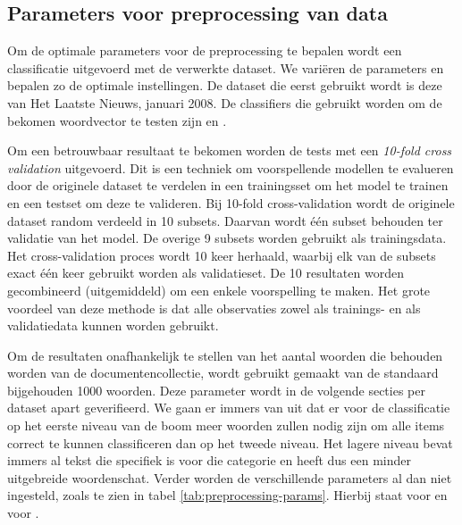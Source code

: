 \subsection{Parameters voor preprocessing van data}\label{parameters-voor-preprocessing}

Om de optimale parameters voor de preprocessing te bepalen wordt een classificatie uitgevoerd met de verwerkte dataset. We vari\"eren de parameters en bepalen zo de optimale instellingen. De dataset die eerst gebruikt wordt is deze van Het Laatste Nieuws, januari 2008. De classifiers die gebruikt worden om de bekomen woordvector te testen zijn  en . 

Om een betrouwbaar resultaat te bekomen worden de tests met een \textit{10-fold cross validation}\label{10-fold-cv} \cite{Bengio2004} uitgevoerd. Dit is een techniek om voorspellende modellen te evalueren door de originele dataset te verdelen in een trainingsset om het model te trainen en een testset om deze te valideren. Bij 10-fold cross-validation\label{cross-val} wordt de originele dataset random verdeeld in 10 subsets. Daarvan wordt \'e\'en subset behouden ter validatie van het model. De overige 9 subsets worden gebruikt als trainingsdata. Het cross-validation proces wordt 10 keer herhaald, waarbij elk van de subsets exact \'e\'en keer gebruikt worden als validatieset. De 10 resultaten worden gecombineerd (uitgemiddeld) om een enkele voorspelling te maken. Het grote voordeel van deze methode is dat alle observaties zowel als trainings- en als validatiedata kunnen worden gebruikt. 

Om de resultaten onafhankelijk te stellen van het aantal woorden die behouden worden van de documentencollectie, wordt gebruikt gemaakt van de standaard bijgehouden 1000 woorden. Deze parameter wordt in de volgende secties per dataset apart geverifieerd. We gaan er immers van uit dat er voor de classificatie op het eerste niveau van de boom meer woorden zullen nodig zijn om alle items correct te kunnen classificeren dan op het tweede niveau. Het lagere niveau bevat immers al tekst die specifiek is voor die categorie en heeft dus een minder uitgebreide woordenschat. Verder worden de verschillende parameters al dan niet ingesteld, zoals te zien in tabel \ref{tab:preprocessing-params}. Hierbij staat  voor  en  voor .

